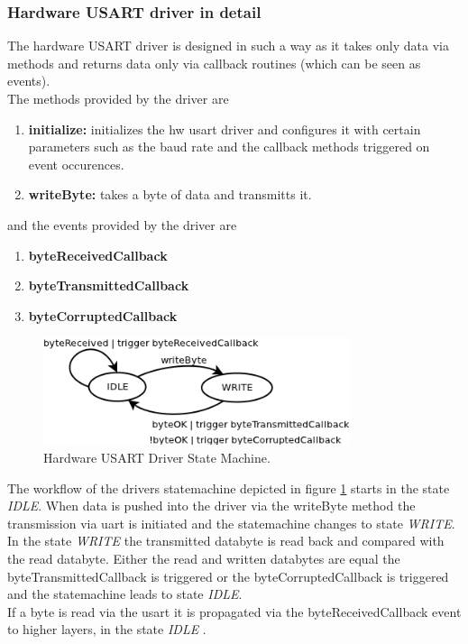 \subsubsection{Hardware USART driver in detail}
\label{sec:bus:design:layer1:interface:hwuart}

The hardware USART driver is designed in such a way as it takes only data via methods and returns data only via callback routines (which can be seen as events).\\

The methods provided by the driver are

\begin{enumerate}
 \item \textbf{initialize: } initializes the hw usart driver and configures it with certain parameters such as the baud rate and the callback methods triggered on event occurences.
 \item \textbf{writeByte: } takes a byte of data and transmitts it.
\end{enumerate}

and the events provided by the driver are

\begin{enumerate}
 \item \textbf{byteReceivedCallback}
 \item \textbf{byteTransmittedCallback}
 \item \textbf{byteCorruptedCallback}
\end{enumerate}

\begin{figure}[h]
\centering
\includegraphics[width=0.8\textwidth]{../images/hwuart_statemachine.png}
\caption{Hardware USART Driver State Machine.}
\label{fig:bus:design:layer1:interface:hwuart}
\end{figure}

The workflow of the drivers statemachine depicted in figure \ref{fig:bus:design:layer1:interface:hwuart} starts in the state \textit{IDLE}.
When data is pushed into the driver via the writeByte method the transmission via uart is initiated and the statemachine changes to state \textit{WRITE}.\\

In the state \textit{WRITE} the transmitted databyte is read back and compared with the read databyte. 
Either the read and written databytes are equal the byteTransmittedCallback is triggered or the byteCorruptedCallback is triggered and the statemachine leads to state \textit{IDLE}.\\

If a byte is read via the usart it is propagated via the byteReceivedCallback event to higher layers, in the state \textit{IDLE} .\\
